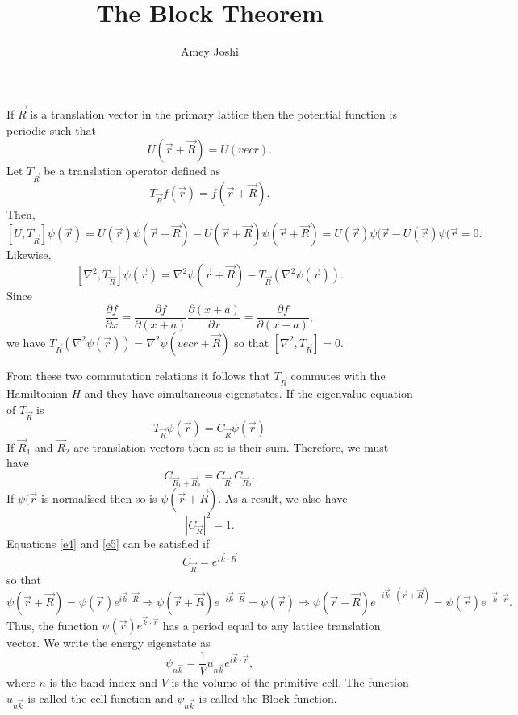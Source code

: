 \documentclass{article}
\title{The Block Theorem}
\begin{document}
\author{Amey Joshi}
\maketitle
If $\vec{R}$ is a translation vector in the primary lattice then the potential
function is periodic such that
\begin{equation}\label{e1}
U(\vec{r} + \vec{R}) = U(vec{r}).
\end{equation}
Let $T_{\vec{R}}$ be a translation operator defined as
\begin{equation}\label{e2}
T_{\vec{R}} f(\vec{r}) = f(\vec{r} + \vec{R}).
\end{equation}
Then,
\[
[U, T_{\vec{R}}]\psi(\vec{r}) = U(\vec{r})\psi(\vec{r} + \vec{R}) - U(\vec{r} + 
\vec{R})\psi(\vec{r} + \vec{R}) = U(\vec{r})\psi(\vec{r} - U(\vec{r})
\psi(\vec{r} = 0.
\]
Likewise,
\[
[\nabla^2, T_{\vec{R}}]\psi(\vec{r}) = \nabla^2\psi(\vec{r} + \vec{R}) - 
T_{\vec{R}}\left(\nabla^2 \psi(\vec{r})\right).
\]
Since
\[
\frac{\partial f}{\partial x} = \frac{\partial f}{\partial (x+a)}
\frac{\partial (x+a)}{\partial x} = \frac{\partial f}{\partial (x+a)},
\]
we have $T_{\vec{R}}\left(\nabla^2 \psi(\vec{r})\right) = \nabla^2 \psi(vec{r} +
\vec{R})$ so that $[\nabla^2, T_{\vec{R}}] = 0$.

From these two commutation relations it follows that $T_{\vec{R}}$ commutes with
the Hamiltonian $H$ and they have simultaneous eigenstates. If the eigenvalue
equation of $T_{\vec{R}}$ is
\begin{equation}\label{e3}
T_{\vec{R}}\psi(\vec{r}) = C_{\vec{R}}\psi(\vec{r})
\end{equation}
If $\vec{R}_1$ and $\vec{R}_2$ are translation vectors then so is their sum.
Therefore, we must have
\begin{equation}\label{e4}
C_{\vec{R}_1 + \vec{R}_2} = C_{\vec{R}_1}C_{\vec{R}_2}.
\end{equation}
If $\psi(\vec{r}$ is normalised then so is $\psi(\vec{r} + \vec{R})$. As a 
result, we also have
\begin{equation}\label{e5}
|C_{\vec{R}}|^2 = 1.
\end{equation}
Equations \eqref{e4} and \eqref{e5} can be satisfied if
\begin{equation}\label{e6}
C_{\vec{R}} = e^{i\vec{k}\cdot\vec{R}}
\end{equation}
so that
\[
\psi(\vec{r} + \vec{R}) = \psi(\vec{r}) e^{i\vec{k}\cdot\vec{R}} \Rightarrow
\psi(\vec{r} + \vec{R})e^{-i\vec{k}\cdot\vec{R}} = \psi(\vec{r}) \Rightarrow
\psi(\vec{r} + \vec{R})e^{-i\vec{k}\cdot(\vec{r} + \vec{R})} = 
\psi(\vec{r})e^{-\vec{k}\cdot\vec{r}}.
\]
Thus, the function $\psi(\vec{r})e^{\vec{k}\cdot\vec{r}}$ has a period equal to
any lattice translation vector. We write the energy eigenstate as
\begin{equation}\label{e7}
\psi_{n\vec{k}} = \frac{1}{V}u_{n\vec{k}} e^{i\vec{k}\cdot\vec{r}},
\end{equation}
where $n$ is the band-index and $V$ is the volume of the primitive cell. The
function $u_{n\vec{k}}$ is called the cell function and $\psi_{n\vec{k}}$ is
called the Block function.
\end{document}
